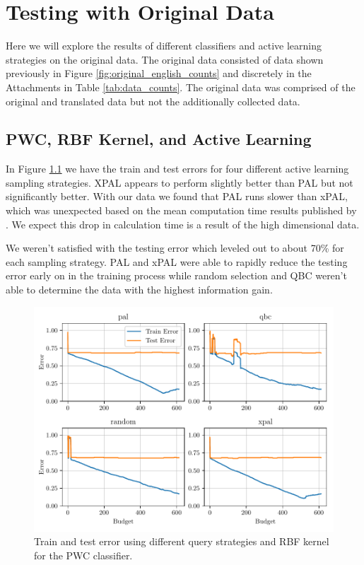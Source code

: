 \chapter{Testing with Original Data}

Here we will explore the results of different classifiers and active learning strategies on the original data. The original data consisted of data shown previously in Figure \ref{fig:original_english_counts} and discretely in the Attachments in Table \ref{tab:data_counts}. The original data was comprised of the original and translated data but not the additionally collected data. 

\section{PWC, RBF Kernel, and Active Learning}

In Figure \ref{fig:plot_all_results_rbf} we have the train and test errors for four different active learning sampling strategies. XPAL appears to perform slightly better than PAL but not significantly better. With our data we found that PAL runs slower than xPAL, which was unexpected based on the mean computation time results published by \cite{kottke2021toward}. We expect this drop in calculation time is a result of the high dimensional data.

We weren't satisfied with the testing error which leveled out to about 70\% for each sampling strategy. PAL and xPAL were able to rapidly reduce the testing error early on in the training process while random selection and QBC weren't able to determine the data with the highest information gain. 

\begin{figure}[ht]
  \centering
  \includegraphics[width=\scale\textwidth]{../img/plot_all_results_rbf.pdf}
  \caption{Train and test error using different query strategies and RBF kernel for the PWC classifier.}
  \label{fig:plot_all_results_rbf}
\end{figure}


